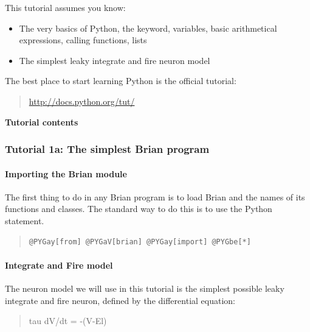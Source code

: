 \documentclass[letterpaper,10pt]{manual}
\begin{document}
This tutorial assumes you know:
\begin{itemize}
\item {} 
The very basics of Python, the  keyword, variables, basic
arithmetical expressions, calling functions, lists

\item {} 
The simplest leaky integrate and fire neuron model

\end{itemize}

The best place to start learning Python is the official tutorial:
\begin{quote}

\href{http://docs.python.org/tut/}{http://docs.python.org/tut/}
\end{quote}

\textbf{Tutorial contents}

\resetcurrentobjects


\subsubsection{Tutorial 1a: The simplest Brian program}


\paragraph{Importing the Brian module}

The first thing to do in any Brian program is to load Brian and the names of
its functions and classes. The standard way to do this is to use the Python
 statement.
\begin{quote}

\begin{Verbatim}[commandchars=@\[\]]
@PYGay[from] @PYGaV[brian] @PYGay[import] @PYGbe[*]
\end{Verbatim}
\end{quote}


\paragraph{Integrate and Fire model}

The neuron model we will use in this tutorial is the simplest possible
leaky integrate and fire neuron, defined by the differential equation:
\begin{quote}

tau dV/dt = -(V-El)
\end{quote}
\end{document}
